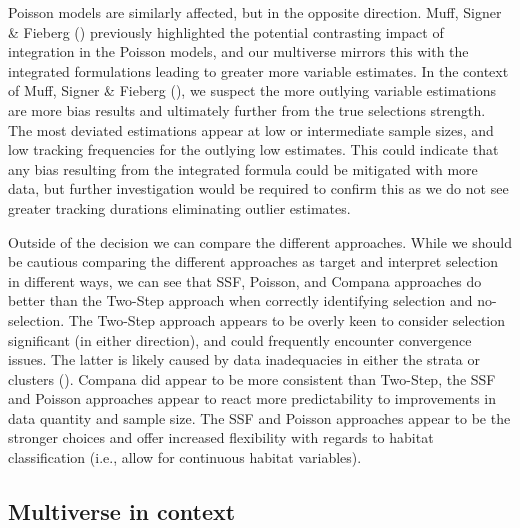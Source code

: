 \documentclass[10pt,a4paper]{article}
\begin{document}
Poisson models are similarly affected, but in the opposite direction.
Muff, Signer \& Fieberg () previously highlighted the potential contrasting impact of integration in the Poisson models, and our multiverse mirrors this with the integrated formulations leading to greater more variable estimates.
In the context of Muff, Signer \& Fieberg (), we suspect the more outlying variable estimations are more bias results and ultimately further from the true selections strength.
The most deviated estimations appear at low or intermediate sample sizes, and low tracking frequencies for the outlying low estimates.
This could indicate that any bias resulting from the integrated formula could be mitigated with more data, but further investigation would be required to confirm this as we do not see greater tracking durations eliminating outlier estimates.

Outside of the decision we can compare the different approaches.
While we should be cautious comparing the different approaches as target and interpret selection in different ways, we can see that SSF, Poisson, and Compana approaches do better than the Two-Step approach when correctly identifying selection and no-selection.
The Two-Step approach appears to be overly keen to consider selection significant (in either direction), and could frequently encounter convergence issues.
The latter is likely caused by data inadequacies in either the strata or clusters ().
Compana did appear to be more consistent than Two-Step, the SSF and Poisson approaches appear to react more predictability to improvements in data quantity and sample size.
The SSF and Poisson approaches appear to be the stronger choices and offer increased flexibility with regards to habitat classification (i.e., allow for continuous habitat variables).

\subsection{Multiverse in context}\label{multiverse-in-context}
\end{document}
